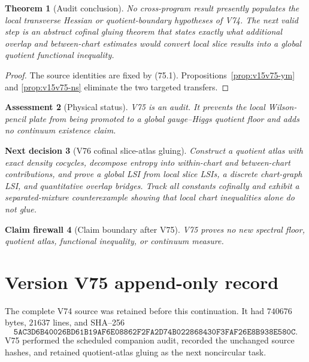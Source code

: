 \documentclass[11pt]{article}
\newtheorem{theorem}{Theorem}[section]
\newtheorem{firewall}[theorem]{Claim firewall}
\newtheorem{decision}[theorem]{Next decision}
\newtheorem{assessment}[theorem]{Assessment}
\theoremstyle{remark}
\begin{document}
\begin{theorem}[Audit conclusion]
\label{thm:v15v75-conclusion}
No cross-program result presently populates the local transverse
Hessian or quotient-boundary hypotheses of V74.  The next valid
step is an abstract cofinal gluing theorem that states exactly what
additional overlap and between-chart estimates would convert local
slice results into a global quotient functional inequality.
\end{theorem}

\begin{proof}
The source identities are fixed by (75.1).
Propositions~\ref{prop:v15v75-ym} and
\ref{prop:v15v75-ns} eliminate the two targeted transfers.
\end{proof}

\begin{assessment}[Physical status]
\label{ass:v15v75-status}
V75 is an audit.  It prevents the local Wilson-pencil plate from
being promoted to a global gauge--Higgs quotient floor and adds no
continuum existence claim.
\end{assessment}

\begin{decision}[V76 cofinal slice-atlas gluing]
\label{dec:v15v75-next}
Construct a quotient atlas with exact density cocycles, decompose
entropy into within-chart and between-chart contributions, and
prove a global LSI from local slice LSIs, a discrete chart-graph
LSI, and quantitative overlap bridges.  Track all constants
cofinally and exhibit a separated-mixture counterexample showing
that local chart inequalities alone do not glue.
\end{decision}

\begin{firewall}[Claim boundary after V75]
\label{fire:v15v75}
V75 proves no new spectral floor, quotient atlas, functional
inequality, or continuum measure.
\end{firewall}

\section*{Version V75 append-only record}
The complete V74 source was retained before this continuation.  It
had \(740676\) bytes, \(21637\) lines, and SHA--256
\[
 \texttt{5AC3D6B40026BD61B19AF6E08862F2FA2D74B022868430F3FAF26E8B938E580C}.
\]
V75 performed the scheduled companion audit, recorded the
unchanged source hashes, and retained quotient-atlas gluing as the
next noncircular task.
\end{document}
